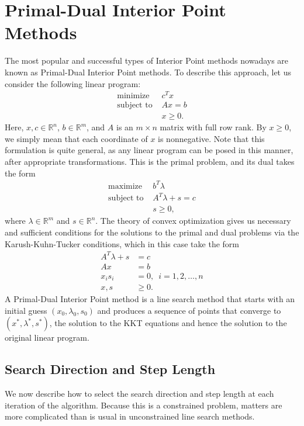 \section*{Primal-Dual Interior Point Methods}
The most popular and successful types of Interior Point methods nowadays are known as Primal-Dual Interior Point methods. To
describe this approach, let us consider the following linear program:
\begin{align*}
\text{minimize } &c^Tx\\
\text{subject to } &Ax = b\\
&x \geq 0.
\end{align*}
Here, $x, c \in \mathbb{R}^n$, $b \in \mathbb{R}^m$, and $A$ is an $m \times n$ matrix with full row rank. By $x \geq 0$, we
simply mean that each coordinate of $x$ is nonnegative. Note that this formulation is quite general, as any linear program can be
posed in this manner, after appropriate transformations. This is the primal problem, and its dual takes the form
\begin{align*}
\text{maximize } &b^T\lambda\\
\text{subject to } &A^T\lambda + s = c\\
&s \geq 0,
\end{align*}
where $\lambda \in \mathbb{R}^m$ and $s \in \mathbb{R}^n$. The theory of convex optimization gives us necessary and sufficient
conditions for the solutions to the primal and dual problems via the Karush-Kuhn-Tucker conditions, which in this case take the form
\begin{align*}
A^T\lambda + s &= c\\
Ax &= b\\
x_is_i &= 0, \,\,\, i = 1,2,\ldots,n\\
x, s &\geq 0.
\end{align*}
A Primal-Dual Interior Point method is a line search method that starts with an initial guess $(x_0, \lambda_0, s_0)$
and produces a sequence of points that converge to $(x^*, \lambda^*, s^*)$, the solution to the KKT equations and hence
the solution to the original linear program.

\subsection*{Search Direction and Step Length}
We now describe how to select the search direction and step length at each iteration of the algorithm. Because this is 
a constrained problem, matters are more complicated than is usual in unconstrained line search methods.

